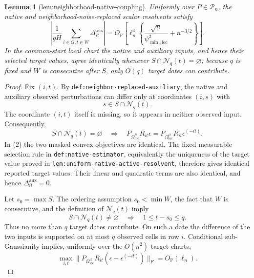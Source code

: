 \documentclass{article}
\newtheorem{lemma}{Lemma}
\begin{document}
\begin{lemma}[lem:neighborhood-native-coupling]\label{lem:neighborhood-native-coupling}
Uniformly over \(P\in\mathcal P_n\), the native and neighborhood-noise-replaced scalar resolvents satisfy
\[
 \left|\frac1{gH}\sum_{i\in G,t\in W}\Delta^{\mathrm{aux}}_{it}\right|
 =O_{\mathbb P}\!\left[
 \ell_n^4\left\{\frac{\sqrt n}{\psi_{\min,\mathrm{loc}}^2}
 +n^{-3/2}\right\}\right].
\]
In the common-start local chart the native and auxiliary inputs, and hence their selected target values, agree identically whenever \(S\cap\mathcal N_q(t)=\varnothing\); because \(q\) is fixed and \(W\) is consecutive after \(S\), only \(O(q)\) target dates can contribute.
\end{lemma}
\begin{proof}
Fix \((i,t)\).  By \texttt{def:neighbor-replaced-auxiliary}, the native and auxiliary observed perturbations can differ only at coordinates \((i,s)\) with
\[
 s\in S\cap\mathcal N_q(t).
 \tag{1}
\]
The coordinate \((i,t)\) itself is missing, so it appears in neither observed input.  Consequently,
\[
 S\cap\mathcal N_q(t)=\varnothing
 \quad\Longrightarrow\quad
 P_{\Omega_{\mathrm{loc}}^{it}}R_{it}\epsilon
 =P_{\Omega_{\mathrm{loc}}^{it}}R_{it}\epsilon^{(-it)}.
 \tag{2}
\]
In (2) the two masked convex objectives are identical.  The fixed measurable selection rule in \texttt{def:native-estimator}, equivalently the uniqueness of the target value proved in \texttt{lem:uniform-native-active-resolvent}, therefore gives identical reported target values.  Their linear and quadratic terms are also identical, and hence \(\Delta^{\mathrm{aux}}_{it}=0\).

Let \(s_0=\max S\).  The ordering assumption \(s_0<\min W\), the fact that \(W\) is consecutive, and the definition of \(\mathcal N_q(t)\) imply
\[
 S\cap\mathcal N_q(t)\ne\varnothing
 \quad\Longrightarrow\quad
 1\le t-s_0\le q.
 \tag{3}
\]
Thus no more than \(q\) target dates contribute.  On such a date the difference of the two inputs is supported on at most \(q\) observed cells in row \(i\).  Conditional sub-Gaussianity implies, uniformly over the \(O(n^2)\) target charts,
\[
 \max_{i,t}\|P_{\Omega_{\mathrm{loc}}^{it}}R_{it}
 (\epsilon-\epsilon^{(-it)})\|_F=O_{\mathbb P}(\ell_n).
 \tag{4}
\]


\end{proof}
\end{document}
